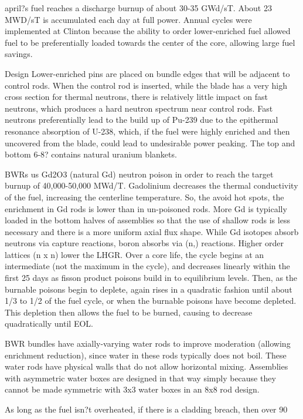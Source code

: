 \documentclass[10pt]{article}
\begin{document}
april?s fuel reaches a discharge burnup of about 30-35 GWd/sT. About 23 MWD/sT is accumulated each day at full power. Annual cycles were implemented at Clinton because the ability to order lower-enriched fuel allowed fuel to be preferentially loaded towards the center of the core, allowing large fuel savings.

Design
Lower-enriched pins are placed on bundle edges that will be adjacent to control rods. When the control rod is inserted, while the blade has a very high cross section for thermal neutrons, there is relatively little impact on fast neutrons, which produces a hard neutron spectrum near control rods. Fast neutrons preferentially lead to the build up of Pu-239 due to the epithermal resonance absorption of U-238, which, if the fuel were highly enriched and then uncovered from the blade, could lead to undesirable power peaking. The top and bottom 6-8? contains natural uranium blankets. 

BWRs us Gd2O3 (natural Gd) neutron poison in order to reach the target burnup of 40,000-50,000 MWd/T. Gadolinium decreases the thermal conductivity of the fuel, increasing the centerline temperature. So, the avoid hot spots, the enrichment in Gd rods is lower than in un-poisoned rods. More Gd is typically loaded in the bottom halves of assemblies so that the use of shallow rods is less necessary and there is a more uniform axial flux shape. While Gd isotopes absorb neutrons via capture reactions, boron absorbs via (n,) reactions. Higher order lattices (n x n) lower the LHGR. Over a core life, the cycle begins at an intermediate  (not the maximum in the cycle), and decreases linearly within the first 25 days as fisson product poisons build in to equilibrium levels. Then, as the burnable poisons begin to deplete,  again rises in a quadratic fashion until about 1/3 to 1/2 of the fuel cycle, or when the burnable poisons have become depleted. This depletion then allows the fuel to be burned, causing  to decrease quadratically until EOL.  

BWR bundles have axially-varying water rods to improve moderation (allowing enrichment reduction), since water in these rods typically does not boil. These water rods have physical walls that do not allow horizontal mixing. Assemblies with asymmetric water boxes are designed in that way simply because they cannot be made symmetric with 3x3 water boxes in an 8x8 rod design. 

As long as the fuel isn?t overheated, if there is a cladding breach, then over 90%
\end{document}
